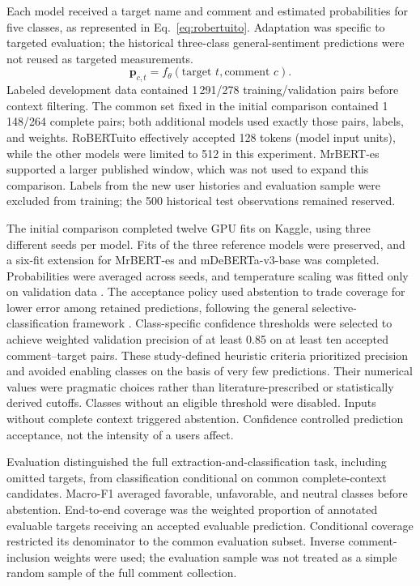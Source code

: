 \documentclass[conference, letterpaper]{IEEEtran}
\begin{document}
Each model received a target name and comment and estimated probabilities for five classes, as represented in Eq.~\eqref{eq:robertuito}. Adaptation was specific to targeted evaluation; the historical three-class general-sentiment predictions were not reused as targeted measurements.
\begin{equation}
\boldsymbol{p}_{c,t}=f_{\theta}(\text{target }t,\text{comment }c).
\label{eq:robertuito}
\end{equation}
Labeled development data contained 1\,291/278 training/validation pairs before context filtering. The common set fixed in the initial comparison contained 1\,148/264 complete pairs; both additional models used exactly those pairs, labels, and weights. RoBERTuito effectively accepted 128 tokens (model input units), while the other models were limited to 512 in this experiment. MrBERT-es supported a larger published window, which was not used to expand this comparison. Labels from the new user histories and evaluation sample were excluded from training; the 500 historical test observations remained reserved.

The initial comparison completed twelve GPU fits on Kaggle, using three different seeds per model. Fits of the three reference models were preserved, and a six-fit extension for MrBERT-es and mDeBERTa-v3-base was completed. Probabilities were averaged across seeds, and temperature scaling was fitted only on validation data \cite{Guo2017Calibration}. The acceptance policy used abstention to trade coverage for lower error among retained predictions, following the general selective-classification framework \cite{Geifman2017Selective}. Class-specific confidence thresholds were selected to achieve weighted validation precision of at least 0.85 on at least ten accepted comment--target pairs. These study-defined heuristic criteria prioritized precision and avoided enabling classes on the basis of very few predictions. Their numerical values were pragmatic choices rather than literature-prescribed or statistically derived cutoffs. Classes without an eligible threshold were disabled. Inputs without complete context triggered abstention. Confidence controlled prediction acceptance, not the intensity of a user\textquotesingle s affect. 

Evaluation distinguished the full extraction-and-classification task, including omitted targets, from classification conditional on common complete-context candidates. Macro-F1 averaged favorable, unfavorable, and neutral classes before abstention. End-to-end coverage was the weighted proportion of annotated evaluable targets receiving an accepted evaluable prediction. Conditional coverage restricted its denominator to the common evaluation subset. Inverse comment-inclusion weights were used; the evaluation sample was not treated as a simple random sample of the full comment collection.
\end{document}
